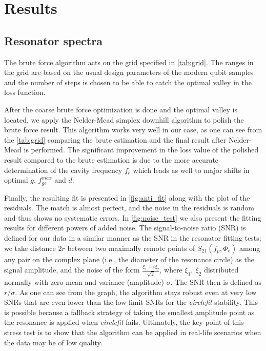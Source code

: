 \documentclass[%
 aip,
 amsmath,amssymb,
 reprint,%
]{revtex4-1}
\begin{document}
\section{Results}

\subsection{Resonator spectra}

The brute force algorithm acts on the grid specified in \autoref{tab:grid}. The ranges in the grid are based on the usual design parameters of the modern qubit samples and the number of steps is chosen to be able to catch the optimal valley in the loss function. 

After the coarse brute force optimization is done and the optimal valley is located, we apply the Nelder-Mead simplex downhill algorithm to polish the brute force result. This algorithm works very well in our case, as one can see from the \autoref{tab:grid} comparing the brute estimation and  the final result after Nelder-Mead is performed. The significant improvement in the loss value of the polished result compared to the brute estimation is due to the more accurate determination of the cavity frequency $f_c$ which leads as well to major shifts in optimal $g$, $f_{ge}^{max}$ and $d$.


Finally, the resulting fit is presented in \autoref{fig:anti_fit} along with the plot of the residuals. The match is almost perfect, and the noise in the residuals is random and thus shows no systematic errors. In \autoref{fig:noise_test} we also present the fitting results for different powers of added noise. The signal-to-noise ratio (SNR) is defined for our data in a similar manner as the SNR in the resonator fitting tests\cite{probst2015}; we take distance $2r$ between two maximally remote points of $S_{21}(f_p, \Phi_e)$ among any pair on the complex plane (i.e., the diameter of the resonance circle) as the signal amplitude, and the noise of the form $\frac{\xi_1+i\xi_2}{\sqrt 2}$, where $\xi_1,\ \xi_2$ distributed normally with zero mean and variance (amplitude) $\sigma$. The SNR then is defined as $r/\sigma$. As one can see from the graph, the algorithm stays robust even at very low SNRs that are even lower than the low limit SNRs for the \textit{circlefit} stability. This is possible because a fallback strategy of taking the smallest amplitude point as the resonance is applied when \textit{circlefit} fails. Ultimately, the key point of this stress test is to show that the algorithm can be applied in real-life scenarios when the data may be of low quality.
\end{document}
